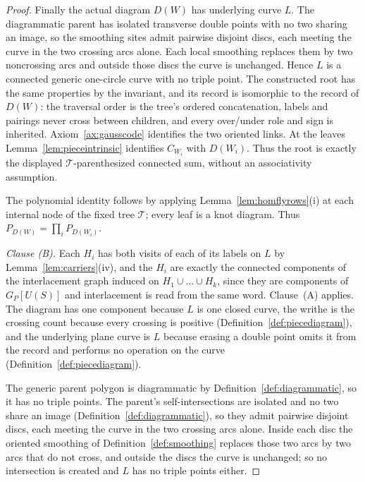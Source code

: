 \begin{proof}
Finally the actual diagram $D(W)$ has underlying curve $L$. The diagrammatic
parent has isolated transverse double points with no two sharing an image, so
the smoothing sites admit pairwise disjoint discs, each meeting the curve in
the two crossing arcs alone. Each local smoothing replaces them by two
noncrossing arcs and outside those discs the curve is unchanged. Hence $L$ is
a connected generic one-circle curve with no triple point. The constructed
root has the same properties by the invariant, and its record is isomorphic to
the record of $D(W)$: the traversal order is the tree's ordered concatenation,
labels and pairings never cross between children, and every over/under role and
sign is inherited. Axiom~\ref{ax:gausscode} identifies the two oriented links.
At the leaves Lemma~\ref{lem:pieceintrinsic} identifies $C_{W_i}$ with
$D(W_i)$. Thus the root is exactly the displayed
$\mathcal T$-parenthesized connected sum, without an associativity assumption.

The polynomial identity follows by applying
Lemma~\ref{lem:homflyrows}(i) at each internal node of the fixed tree
$\mathcal T$; every leaf is a knot diagram. Thus
$P_{D(W)}=\prod_iP_{D(W_i)}$.

\emph{Clause (B).}
Each $H_i$ has both visits of each of its labels on $L$ by
Lemma~\ref{lem:carriers}(iv), and the $H_i$ are exactly the connected
components of the interlacement graph induced on $H_1\cup\dots\cup H_k$, since
they are components of $G_P[U(S)]$ and interlacement is read from the same
word. Clause~(A) applies. The diagram has one component
because $L$ is one closed curve, the writhe is the crossing count because every
crossing is positive (Definition~\ref{def:piecediagram}), and the underlying
plane curve is $L$ because erasing a double point omits it from the record and
performs no operation on the curve (Definition~\ref{def:piecediagram}).

The generic parent polygon is diagrammatic by
Definition~\ref{def:diagrammatic}, so it has no triple points.  The parent's
self-intersections are isolated and no two share an image
(Definition~\ref{def:diagrammatic}), so they admit pairwise disjoint discs,
each meeting the curve in the two crossing arcs alone.  Inside each disc the
oriented smoothing of Definition~\ref{def:smoothing} replaces those two arcs
by two arcs that do not cross, and outside the discs the curve is unchanged;
so no intersection is created and $L$ has no triple points either.


\end{proof}
